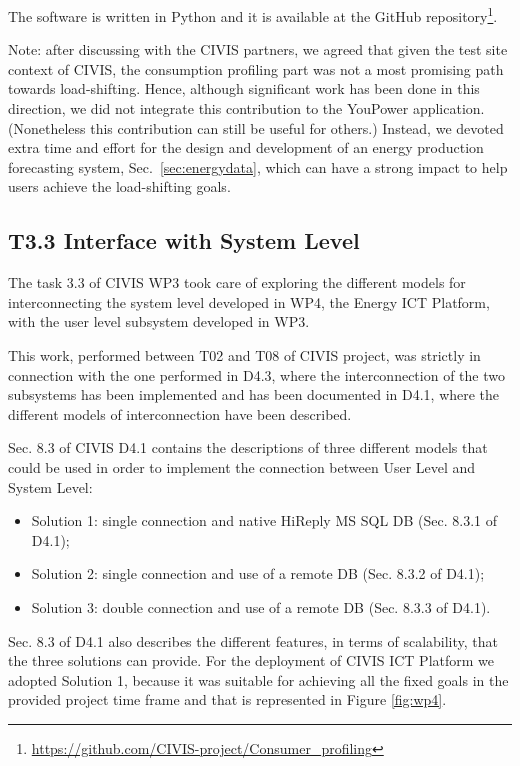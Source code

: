 The software is written in Python and it is available at the GitHub repository\footnote{\url{https://github.com/CIVIS-project/Consumer_profiling}}.

Note: after discussing with the CIVIS partners, we agreed that given the test site context of CIVIS, the consumption profiling part was not a most promising path towards load-shifting. Hence, although significant work has been done in this direction, we did not integrate this contribution to the YouPower application. (Nonetheless this contribution can still be useful for others.)
Instead, we devoted extra time and effort for the design and development of an energy production forecasting
system, Sec.~\ref{sec:energydata}, which can have a strong impact to help users achieve the load-shifting goals.

\subsection{T3.3 Interface with System Level}

The task 3.3 of CIVIS WP3 took care of exploring the different models for interconnecting the system level developed in WP4, the Energy ICT Platform, with the user level subsystem developed in WP3.

This work, performed between T02 and T08 of CIVIS project, was strictly in connection with the one performed in D4.3, where the interconnection of the two subsystems has been implemented and has been documented in D4.1, where the different models of interconnection have been described.

Sec. 8.3 of CIVIS D4.1 contains the descriptions of three different models that could be used in order to implement the connection between User Level and System Level:

\begin{itemize}
\item Solution 1: single connection and native HiReply MS SQL DB (Sec. 8.3.1 of D4.1);
\item Solution 2: single connection and use of a remote DB (Sec. 8.3.2 of D4.1);
\item Solution 3: double connection and use of a remote DB (Sec. 8.3.3 of D4.1).
\end{itemize}

Sec. 8.3 of D4.1 also describes the different features, in terms of scalability, that the three solutions can provide. For the deployment of CIVIS ICT Platform we adopted Solution 1, because it was suitable for achieving all the fixed goals in the provided project time frame and that is represented in Figure \ref{fig:wp4}.

